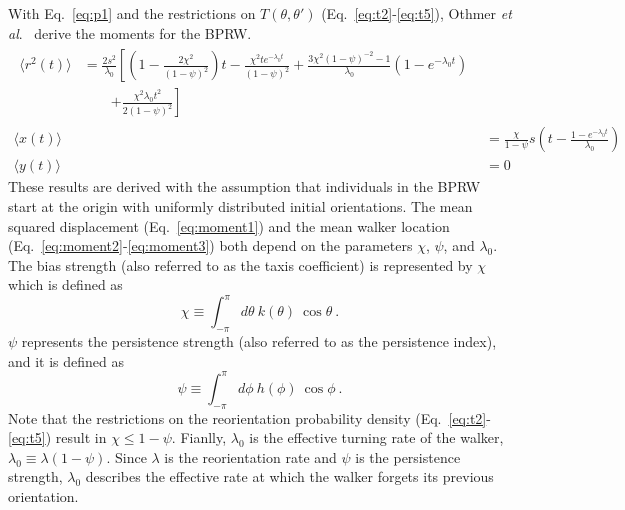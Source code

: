 With Eq.\ \ref{eq:p1} and the restrictions on $T(\theta,\theta')$ (Eq.\ \ref{eq:t2}-\ref{eq:t5}), Othmer \textit{et al}.\ \cite{othmer1988models} derive the moments for the BPRW.
\begin{align} \label{eq:moment1}
    \begin{split}
    \langle r^2(t) \rangle &= \frac{2s^2}{\lambda_0} \left[ \left(1-\frac{2\chi^2}{(1-\psi)^2}\right)t
    - \frac{\chi^2 t e^{-\lambda_0 t}}{(1-\psi)^2}
    + \frac{3\chi^2(1-\psi)^{-2}-1}{\lambda_0} \left(1-e^{-\lambda_0 t}\right)
    \right. \\
    &\qquad \left.
    + \frac{\chi^2 \lambda_0 t^2}{2(1-\psi)^2} \right]
    \end{split} \\
    \langle x(t) \rangle &= \frac{\chi}{1-\psi} s \left(t -\frac{1-e^{-\lambda_0 t}}{\lambda_0} \right) \label{eq:moment2} \\
    \langle y(t) \rangle &= 0 \label{eq:moment3}
\end{align}
These results are derived with the assumption that individuals in the BPRW start at the origin with uniformly distributed initial orientations.
The mean squared displacement (Eq.\ \ref{eq:moment1}) and the mean walker location (Eq.\ \ref{eq:moment2}-\ref{eq:moment3}) both depend on the parameters $\chi$, $\psi$, and $\lambda_0$. The bias strength (also referred to as the taxis coefficient) is represented by $\chi$ which is defined as
\begin{equation} \label{eq:chi}
    \chi \equiv \int_{-\pi}^{\pi} d\theta \ k(\theta) \ \cos\theta \ .
\end{equation}
$\psi$ represents the persistence strength (also referred to as the persistence index), and it is defined as
\begin{equation} \label{eq:psi}
    \psi \equiv \int_{-\pi}^{\pi} d\phi \ h(\phi) \ \cos\phi \ .
\end{equation}
Note that the restrictions on the reorientation probability density (Eq.\ \ref{eq:t2}-\ref{eq:t5}) result in $\chi \leq 1 - \psi$. Fianlly, $\lambda_0$ is the effective turning rate of the walker,
$\lambda_0 \equiv \lambda(1-\psi)$.
Since $\lambda$ is the reorientation rate and $\psi$ is the persistence strength, $\lambda_0$ describes the effective rate at which the walker forgets its previous orientation.

